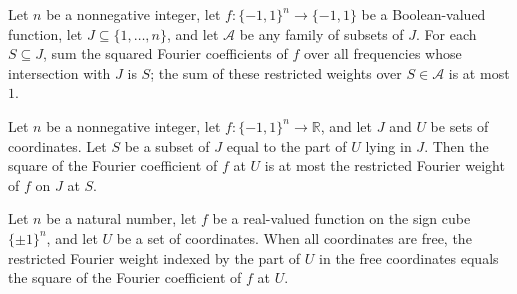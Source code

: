 \begin{theorem}
\label{FABL.sum_restrictedFourierWeight_le_one}
\leanok
{}
Let $n$ be a nonnegative integer, let $f:\{-1,1\}^n\to\{-1,1\}$ be a Boolean-valued
function, let $J\subseteq\{1,\ldots,n\}$, and let $\mathcal A$ be any family of subsets
of $J$. For each $S\subseteq J$, sum the squared Fourier coefficients of $f$ over all
frequencies whose intersection with $J$ is $S$; the sum of these restricted weights over
$S\in\mathcal A$ is at most $1$.
\end{theorem}

\begin{theorem}
\label{FABL.sq_fourierCoeff_le_restrictedFourierWeight}
\leanok
{}
Let $n$ be a nonnegative integer, let $f:\{-1,1\}^n\to\mathbb R$, and let $J$ and
$U$ be sets of coordinates. Let $S$ be a subset of $J$ equal to the part of $U$ lying in
$J$. Then the square of the Fourier coefficient of $f$ at $U$ is at most the restricted
Fourier weight of $f$ on $J$ at $S$.
\end{theorem}

\begin{theorem}
\label{FABL.restrictedFourierWeight_univ_freeFrequencyPart}
\leanok
{}
Let $n$ be a natural number, let $f$ be a real-valued function on the sign cube
$\{\pm1\}^n$, and let $U$ be a set of coordinates. When all coordinates are free, the
restricted Fourier weight indexed by the part of $U$ in the free coordinates equals the
square of the Fourier coefficient of $f$ at $U$.
\end{theorem}

